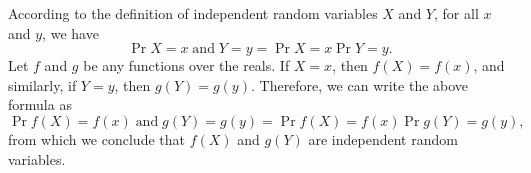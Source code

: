 \starred
According to the definition of independent random variables $X$ and $Y$, for all $x$ and $y$, we have
\[
    \Pr{X=x\;\text{and}\;Y=y} = \Pr{X=x}\Pr{Y=y}.
\]
Let $f$ and $g$ be any functions over the reals.
If $X=x$, then $f(X)=f(x)$, and similarly, if $Y=y$, then $g(Y)=g(y)$.
Therefore, we can write the above formula as
\[
    \Pr{f(X)=f(x)\;\text{and}\;g(Y)=g(y)} = \Pr{f(X)=f(x)}\Pr{g(Y)=g(y)},
\]
from which we conclude that $f(X)$ and $g(Y)$ are independent random variables.
